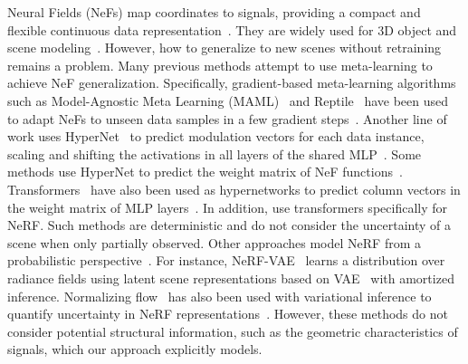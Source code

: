  Neural Fields (NeFs) map coordinates to signals, providing a compact and flexible continuous data representation~\citep{sitzmann2020implicit, tancik2020fourier}. They are widely used for 3D object and scene modeling~\citep{chen2019learning, park2019deepsdf, mescheder2019occupancy, genova2020local, niemeyer2021giraffe}. However, how to generalize to new scenes without retraining remains a problem. 
Many previous methods attempt to use meta-learning to achieve NeF generalization. Specifically, gradient-based meta-learning algorithms such as Model-Agnostic Meta Learning (MAML)~\citep{finn2017model} and Reptile~\citep{nichol2018first} have been used to adapt NeFs to unseen data samples in a few gradient steps~\citep{lee2021meta, sitzmann2020metasdf, tancik2021learned}. Another line of work uses HyperNet~\citep{Ha2016HyperNetworks} to predict modulation vectors for each data instance, scaling and shifting the activations in all layers of the shared MLP~\citep{mehta2021modulated, dupont2022data, dupont2022coin++}. Some methods use HyperNet to predict the weight matrix of NeF functions~\citep{dupont2021generative, zhang20233dshape2vecset}. Transformers~\citep{vaswani2017attention} have also been used as hypernetworks to predict column vectors in the weight matrix of MLP layers~\citep{chen2022transformers, dupont2022coin++}. In addition, \cite{reizenstein2021common,wang2022attention} use transformers specifically for NeRF. Such methods are deterministic and do not consider the uncertainty of a scene when only partially observed. Other approaches model NeRF from a probabilistic perspective~\citep{kosiorek2021nerf, hoffman2023probnerf, dupont2021generative, moreno2023laser,erkocc2023hyperdiffusion}. For instance, NeRF-VAE~\citep{kosiorek2021nerf} learns a distribution over radiance fields using latent scene representations based on VAE~\citep{kingma2013auto} with amortized inference. Normalizing flow~\citep{winkler2019learning} has also been used with variational inference to quantify uncertainty in NeRF representations~\citep{shen2022conditional, wei2023fg}. However, these methods do not consider potential structural information, such as the geometric characteristics of signals, which our approach explicitly models.



